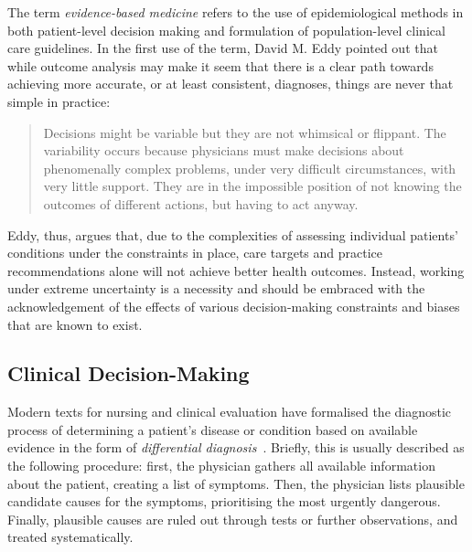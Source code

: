 \documentclass{sigchi}
\begin{document}
The term \emph{evidence-based medicine} refers to the use of epidemiological methods in both patient-level decision making and formulation of population-level clinical care guidelines.  In the first use of the term, David M. Eddy pointed out that while outcome analysis may make it seem that there is a clear path towards achieving more accurate, or at least consistent, diagnoses, things are never that simple in practice:

\begin{quote}
  Decisions might be variable but they are not whimsical or flippant. The variability occurs because physicians must make decisions about phenomenally complex problems, under very difficult circumstances, with very little support. They are in the impossible position of not knowing the outcomes of different actions, but having to act anyway.~\cite{eddy1990challenge}
\end{quote}

Eddy, thus, argues that, due to the complexities of assessing individual patients' conditions under the constraints in place, care targets and practice recommendations alone will not achieve better health outcomes.  Instead, working under extreme uncertainty is a necessity and should be embraced with the acknowledgement of the effects of various decision-making constraints and biases that are known to exist.

\subsection{Clinical Decision-Making} 

 Modern texts for nursing and clinical evaluation have formalised the diagnostic process of determining a patient's disease or condition based on available evidence in the form of \emph{differential diagnosis}~\cite{thompson2002clinical}.  Briefly, this is usually described as the following procedure: first, the physician gathers all available information about the patient, creating a list of symptoms.  Then, the physician lists plausible candidate causes for the symptoms, prioritising the most urgently dangerous.  Finally, plausible causes are ruled out through tests or further observations, and treated systematically.  

\end{document}
